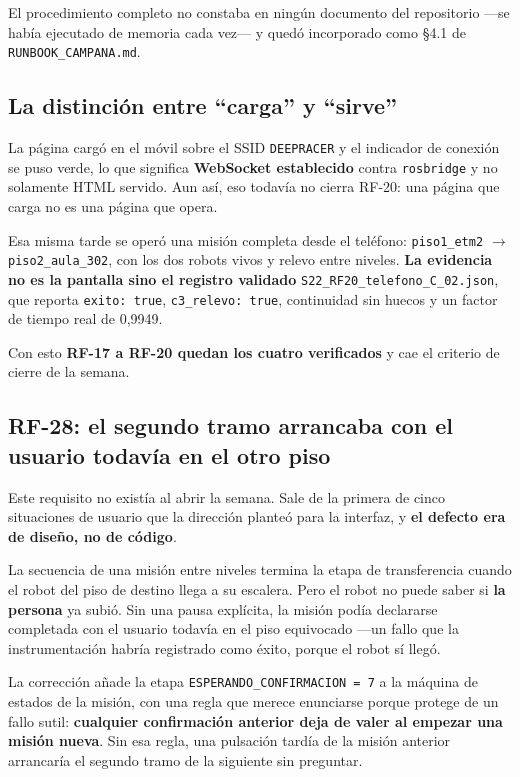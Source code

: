 \documentclass[12pt,letterpaper]{article}
\begin{document}
El procedimiento completo no constaba en ningún documento del repositorio ---se había ejecutado de memoria cada vez--- y quedó incorporado como \S 4.1 de \texttt{RUNBOOK\_CAMPANA.md}.

\subsection{La distinción entre ``carga'' y ``sirve''}

La página cargó en el móvil sobre el SSID \texttt{DEEPRACER} y el indicador de conexión se puso verde, lo que significa \textbf{WebSocket establecido} contra \texttt{rosbridge} y no solamente HTML servido. Aun así, eso todavía no cierra RF-20: una página que carga no es una página que opera.

Esa misma tarde se operó una misión completa desde el teléfono: \texttt{piso1\_etm2} $\rightarrow$ \texttt{piso2\_aula\_302}, con los dos robots vivos y relevo entre niveles. \textbf{La evidencia no es la pantalla sino el registro validado} \texttt{S22\_RF20\_telefono\_C\_02.json}, que reporta \texttt{exito: true}, \texttt{c3\_relevo: true}, continuidad sin huecos y un factor de tiempo real de 0,9949.

Con esto \textbf{RF-17 a RF-20 quedan los cuatro verificados} y cae el criterio de cierre de la semana.

\subsection{RF-28: el segundo tramo arrancaba con el usuario todavía en el otro piso}
\label{sec:rf28}

Este requisito no existía al abrir la semana. Sale de la primera de cinco situaciones de usuario que la dirección planteó para la interfaz, y \textbf{el defecto era de diseño, no de código}.

La secuencia de una misión entre niveles termina la etapa de transferencia cuando el robot del piso de destino llega a su escalera. Pero el robot no puede saber si \textbf{la persona} ya subió. Sin una pausa explícita, la misión podía declararse completada con el usuario todavía en el piso equivocado ---un fallo que la instrumentación habría registrado como éxito, porque el robot sí llegó.

La corrección añade la etapa \texttt{ESPERANDO\_CONFIRMACION = 7} a la máquina de estados de la misión, con una regla que merece enunciarse porque protege de un fallo sutil: \textbf{cualquier confirmación anterior deja de valer al empezar una misión nueva}. Sin esa regla, una pulsación tardía de la misión anterior arrancaría el segundo tramo de la siguiente sin preguntar.
\end{document}
